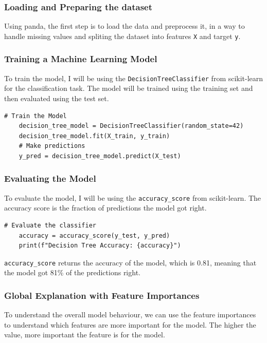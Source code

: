 \documentclass[10pt,journal,compsoc]{IEEEtran}
\begin{document}
\subsubsection{Loading and Preparing the dataset}
Using panda, the first step is to load the data and preprocess it, in a way to handle missing values  and spliting the dataset into features \texttt{X} and target \texttt{y}.

\subsubsection{Training a Machine Learning Model}
To train the model, I will be using the \texttt{DecisionTreeClassifier} from scikit-learn for the classification task. The model will be trained using the training set and then evaluated using the test set.

\begin{lstlisting}[caption=Training a Decision Tree Classifier]
    # Train the Model
    decision_tree_model = DecisionTreeClassifier(random_state=42)
    decision_tree_model.fit(X_train, y_train)
    # Make predictions
    y_pred = decision_tree_model.predict(X_test)
\end{lstlisting}

\subsubsection{Evaluating the Model}
To evaluate the model, I will be using the \texttt{accuracy\_score} from scikit-learn. The accuracy score is the fraction of predictions the model got right.

\begin{lstlisting}[caption=Evaluating the Model]
    # Evaluate the classifier
    accuracy = accuracy_score(y_test, y_pred)
    print(f"Decision Tree Accuracy: {accuracy}")
\end{lstlisting}

\texttt{accuracy\_score} returns the accuracy of the model, which is 0.81, meaning that the model got 81\% of the predictions right.

\subsubsection{Global Explanation with Feature Importances}

To understand the overall model behaviour, we can use the feature importances to understand which features are more important for the model. The higher the value, more important the feature is for the model.
\end{document}
